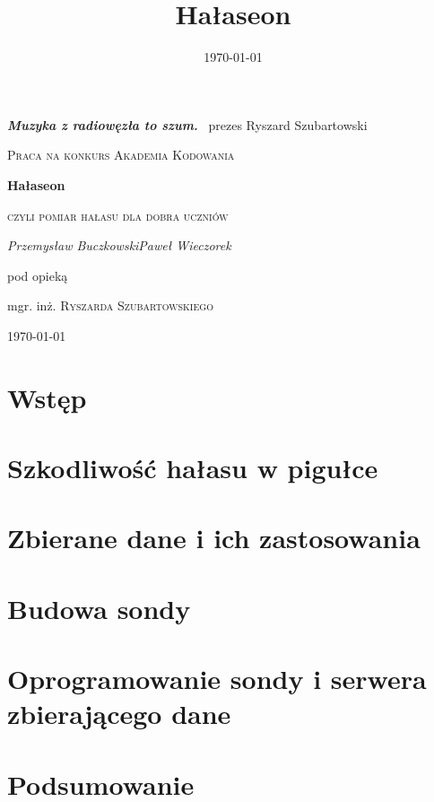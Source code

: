 \documentclass[12pt, a4paper, twoside]{article}
\title{Hałaseon}
\date{\today}
\begin{document}
\begin{titlepage}
	\begin{flushright}
	{\large \color{Goldenrod} \emph{\textbf{Muzyka z radiowęzła to szum.}} \linebreak}
	~prezes Ryszard Szubartowski
	\end{flushright}
	\centering
	\vspace{1.5 cm}
	{\scshape Praca na konkurs Akademia Kodowania\par}
	\vspace{1.5 cm}
	{\huge\bfseries Hałaseon\par}
	\vspace{0.1cm}
	{\scshape\Large czyli pomiar hałasu dla dobra uczniów\par}
	\vspace{2cm}
	{\Large\itshape Przemysław Buczkowski\linebreak Paweł Wieczorek\par}
	\vfill
	pod opieką\par
	mgr. inż. \textsc{Ryszarda Szubartowskiego}

	\vfill

	{\large \today\par}
\end{titlepage}

\tableofcontents

\section{Wstęp}

\section{Szkodliwość hałasu w pigułce}

\section{Zbierane dane i ich zastosowania}

\section{Budowa sondy}

\section{Oprogramowanie sondy i serwera zbierającego dane}

\section{Podsumowanie}

\begin{thebibliography}{9}
\end{thebibliography}
\end{document}
